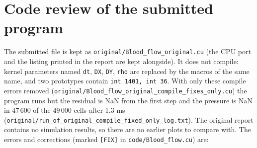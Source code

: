 \section{Code review of the submitted program}
The submitted file is kept as \texttt{original/Blood\_flow\_original.cu} (the CPU port and the listing printed in the report are kept alongside). It does not compile: kernel parameters named \texttt{dt}, \texttt{DX}, \texttt{DY}, \texttt{rho} are replaced by the macros of the same name, and two prototypes contain \texttt{int 1401, int 36}. With only these compile errors removed (\texttt{original/Blood\_flow\_original\_compile\_fixes\_only.cu}) the program runs but the residual is NaN from the first step and the pressure is NaN in 47\,600 of the 49\,000 cells after 1.3 ms (\texttt{original/run\_of\_original\_compile\_fixed\_only\_log.txt}). The original report contains no simulation results, so there are no earlier plots to compare with. The errors and corrections (marked \texttt{[FIX]} in \texttt{code/Blood\_flow.cu}) are:
